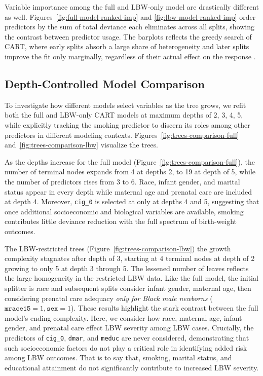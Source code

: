 Variable importance among the full and LBW-only model are drastically different as well. Figures~\ref{fig:full-model-ranked-imp} and \ref{fig:lbw-model-ranked-imp} order predictors by the sum of total deviance each eliminates across all splits, showing the contrast between predictor usage. The barplots reflects the greedy search of CART, where early splits absorb a large share of heterogeneity and later splits improve the fit only marginally, regardless of their actual effect on the response \parencite{cart_greedy}.   

\subsection{Depth-Controlled Model Comparison}
\label{sec:ch3-comparison-depth}

To investigate how different models select variables as the tree grows, we refit both the full and LBW-only CART models at maximum depths of 2, 3, 4, 5, while explicitly tracking the smoking predictor to discern its roles among other predictors in different modeling contexts. Figures~\ref{fig:trees-comparison-full} and~\ref{fig:trees-comparison-lbw} visualize the trees.

As the depths increase for the full model (Figure~\ref{fig:trees-comparison-full}), the number of terminal nodes expands from 4 at depths 2, to 19 at depth of 5, while the number of predictors rises from 3 to 6. Race, infant gender, and marital status appear in every depth while maternal age and prenatal care are included at depth 4. Moreover,  \texttt{cig\_0} is selected at only at depths 4 and 5, suggesting that once additional socioeconomic and biological variables are available, smoking contributes little deviance reduction with the full spectrum of birth-weight outcomes. 

The LBW-restricted trees (Figure~\ref{fig:trees-comparison-lbw}) the growth complexity stagnates after depth of 3, starting at 4 terminal nodes at depth of 2 growing to only 5 at depth 3 through 5. The lessened number of leaves reflects the large homogeneity in the restricted LBW data. Like the full model, the initial splitter is race and subsequent splits consider infant gender, maternal age, then considering prenatal care adequacy \emph{only for Black male newborns} (\(\texttt{mrace15} = 1, \texttt{sex}=1\)). These results highlight the stark contrast between the full model's ending complexity. Here, we consider how race, maternal age, infant gender, and prenatal care effect LBW severity among LBW cases. Crucially, the predictors of \texttt{cig\_0}, \texttt{dmar}, and \texttt{meduc} are never considered, demonstrating that such socioeconomic factors do not play a critical role in identifying added risk among LBW outcomes. That is to say that, smoking, marital status, and educational attainment do not significantly contribute to increased LBW severity.

